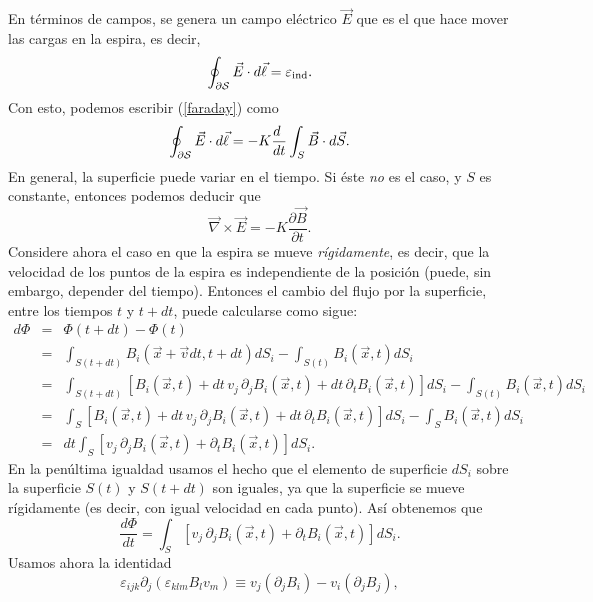 En términos de campos, se genera un campo eléctrico $\vec{E}$ que es el que hace mover las cargas en la espira, es decir,
\begin{equation}
\oint_{\cal\partial S}\vec{E}\cdot d\vec{\ell}=\varepsilon_{\rm ind}.
\end{equation}
Con esto, podemos escribir (\ref{faraday}) como
\begin{equation}
\oint_{\cal \partial S}\vec{E}\cdot d\vec{\ell}=-K\frac{d\ }{dt}\int_S\vec{B}\cdot
d\vec{S}.
\end{equation}
En general, la superficie puede variar en el tiempo. Si éste \textit{no} es el caso, y $S$
es constante, entonces podemos deducir que
\begin{equation}\label{ley-faraday0}
\vec\nabla\times\vec{E}=-K\frac{\partial\vec{B}}{\partial t}.
\end{equation}
Considere ahora el caso en que la espira se mueve \textit{rígidamente}, es decir, que la velocidad de los puntos de la espira es independiente de la posición (puede, sin embargo, depender del tiempo).
Entonces el cambio del flujo por la superficie, entre los tiempos $t$ y $t+dt$, puede calcularse como sigue:
\begin{eqnarray}
 d\Phi &=& \Phi(t+dt)-\Phi(t)\\
&=&
\int_{S(t+dt)}B_i(\vec{x}+\vec{v}dt,t+dt)dS_i-\int_{S(t)}B_i(\vec{x},t)dS_i\\
&=&\int_{S(t+dt)}\left[B_i(\vec{x},t)+dt\,v_j\,\partial_jB_i(\vec{x},
t)+dt\,\partial_tB_i(\vec{x},t)\right ] dS_i-\int_{S(t)}B_i(\vec{x},t)dS_i\\
&=&\int_S\left[B_i(\vec{x},t)+dt\,v_j\,\partial_jB_i(\vec{x},
t)+dt\,\partial_tB_i(\vec{x},t)\right ] dS_i-\int_SB_i(\vec{x},t)dS_i\\
&=&dt\int_S\left[v_j\,\partial_jB_i(\vec{x},t)+\partial_tB_i(\vec{x},t)\right
] dS_i.
\end{eqnarray}
En la penúltima igualdad usamos el hecho que el elemento de superficie $dS_i$ sobre la superficie $S(t)$ y $S(t+dt)$ son iguales, ya que la superficie se mueve rígidamente (es decir, con igual velocidad en cada punto). Así obtenemos que
\begin{equation}\label{dPhidt0}
 \frac{d\Phi}{dt}=\int_S\left[v_j\,\partial_jB_i(\vec{x},t)+\partial_tB_i(\vec
{x},t)\right] dS_i.
\end{equation}
Usamos ahora la identidad
\begin{equation}
\varepsilon_{ijk}\partial_j(\varepsilon_{klm}B_lv_m)\equiv
v_j(\partial_jB_i)-v_i(\partial_jB_j),
\end{equation}
